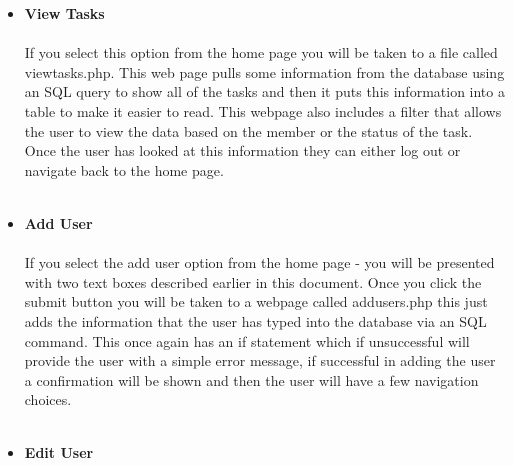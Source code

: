 \documentclass{project}
\begin{document}
\begin{itemize}
\item \textbf{View Tasks} \\~\\
If you select this option from the home page you will be taken to a file called viewtasks.php. This web page pulls some information from the database using an SQL query to show all of the tasks and then it puts this information into a table to make it easier to read.  This webpage also includes a filter that allows the user to view the data based on the member or the status of the task. Once the user has looked at this information they can either log out or navigate back to the home page. \\~\\
\item \textbf{Add User} \\~\\
If you select the add user option from the home page - you will be presented with two text boxes described earlier in this document. Once you click the submit button you will be taken to a webpage called addusers.php this just adds the information that the user has typed into the database via an SQL command. This once again has an if statement which if unsuccessful will provide the user with a simple error message, if successful in adding the user a confirmation will be shown and then the user will have a few navigation choices. \\~\\
\item \textbf{Edit User} \\~\\

\end{itemize}
\end{document}
